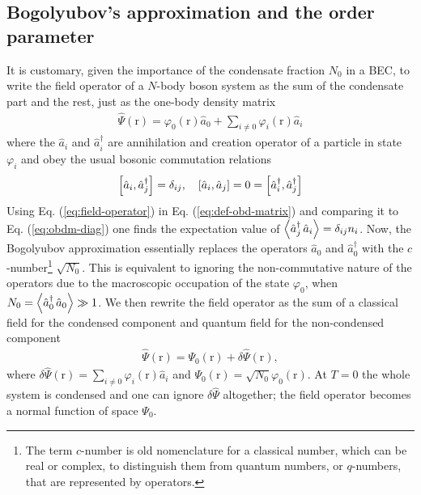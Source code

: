 \documentclass[12pt,a4paper,twosides]{book}
\renewcommand{\vec}[1]{\bm{\mathrm{#1}}}
\begin{document}
		\subsection{Bogolyubov's approximation and the order parameter}\label{sec:bogol-order}
			It is customary, given the importance of the condensate fraction $N_0$ in a BEC, to write the field operator of a $N$-body boson system as the sum of the condensate part and the rest, just as the one-body density matrix
			\begin{align}
				\hat{\Psi}(\vec{r})=\varphi_0(\vec{r})\hat{a}_0 + \sum_{i\neq 0} \varphi_i(\vec{r})\hat{a}_i \label{eq:field-operator}
			\end{align}
			where the $\hat{a}_i$ and $\hat{a}_i^\dagger$ are annihilation and creation operator of a particle in state $\varphi_i$ and obey the usual bosonic commutation relations
			\begin{align}
				\commutator{\hat{a}_i}{\hat{a}_j^\dagger}=\delta_{ij},\quad 	\commutator{\hat{a}_i}{\hat{a}_j}=0=\commutator{\hat{a}_i^\dagger}{\hat{a}_j^\dagger}
			\end{align}
			Using Eq. (\ref{eq:field-operator}) in Eq. (\ref{eq:def-obd-matrix}) and comparing it to Eq. (\ref{eq:obdm-diag}) one finds the expectation value of $\expectationvalue{\hat{a}_j^\dagger\,\hat{a}_i}=\delta_{ij}n_i$. Now, the Bogolyubov approximation essentially replaces the operators $\hat{a}_0$ and $\hat{a}_0^\dagger$ with the $c$-number\footnote{The term $c$-number is old nomenclature for a classical number, which can be real or complex, to distinguish them from quantum numbers, or $q$-numbers, that are represented by operators.} $\sqrt{N_0}$. This is equivalent to ignoring the non-commutative nature of the operators due to the macroscopic occupation of the state $\varphi_0$, when $N_0=\expectationvalue{\hat{a}_0^\dagger\,\hat{a}_0}\gg 1$. We then rewrite the field operator as the sum of a classical field for the condensed component and quantum field for the non-condensed component
			\begin{align}
				\hat{\Psi}(\vec{r})=\Psi_0(\vec{r})+\delta\hat{\Psi}(\vec{r}),\label{eq:order-param-real}
			\end{align}
			where $\delta\hat{\Psi}(\vec{r})=\sum_{i\neq 0}\varphi_i(\vec{r})\hat{a}_i$ and $\Psi_0(\vec{r})=\sqrt{N_0}\varphi_0(\vec{r})$. At $T=0$ the whole system is condensed and one can ignore $\delta\hat{\Psi}$ altogether; the field operator becomes a normal function of space $\Psi_0$.\\
			
\end{document}

